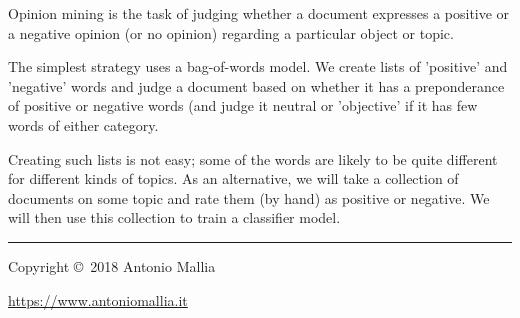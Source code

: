 \documentclass[10pt,landscape]{article}
\begin{document}
\begin{multicols}{3}
Opinion mining is the task of judging whether a document expresses a positive or a negative opinion (or no opinion) regarding a particular object or topic. 

The simplest strategy uses a bag-of-words model. We create lists of 'positive' and 'negative' words and judge a document based on whether it has a preponderance of positive or negative words (and judge it neutral or 'objective' if it has few words of either category.

Creating such lists is not easy; some of the words are likely to be quite different for different kinds of topics. As an alternative, we will take a collection of documents on some topic and rate them (by hand) as positive or negative. We will then use this collection to train a classifier model.




\rule{0.3\linewidth}{0.25pt}
\scriptsize

Copyright \copyright\ 2018 Antonio Mallia

\href{https://www.antoniomallia.it}{https://www.antoniomallia.it}


\end{multicols}
\end{document}

